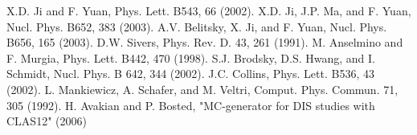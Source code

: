 %
%
%
\begin{thebibliography}{}

 X.D. Ji and F. Yuan, Phys. Lett. B543, 66 (2002).
 X.D. Ji, J.P. Ma, and F. Yuan, Nucl. Phys. B652, 383  (2003). 
 A.V. Belitsky, X. Ji, and F. Yuan, Nucl. Phys. B656, 165 (2003).
 D.W. Sivers, Phys. Rev. D. 43, 261 (1991). 
 M. Anselmino and F. Murgia, Phys. Lett. B442, 470 (1998). 
 S.J. Brodsky, D.S. Hwang, and I. Schmidt, Nucl. Phys. B 642, 344 (2002). 
 J.C. Collins, Phys. Lett. B536, 43 (2002). 
 L. Mankiewicz, A. Schafer, and M. Veltri,
 Comput. Phys. Commun. 71, 305 (1992). 
 H. Avakian and P. Bosted, "MC-generator for DIS studies with CLAS12" (2006)


\end{thebibliography}

%
